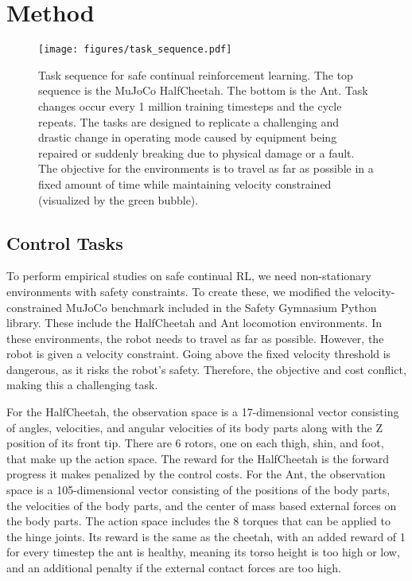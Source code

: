 \section{Method} \label{sec:method}

\begin{figure*}[t]
    \centering
    \texttt{[image: figures/task\_sequence.pdf]}
    \caption{Task sequence for safe continual reinforcement learning. The top sequence is the MuJoCo HalfCheetah. The bottom is the Ant. Task changes occur every 1 million training timesteps and the cycle repeats. The tasks are designed to replicate a challenging and drastic change in operating mode caused by equipment being repaired or suddenly breaking due to physical damage or a fault. The objective for the environments is to travel as far as possible in a fixed amount of time while maintaining velocity constrained (visualized by the green bubble).}
    \label{fig:task_sequence}
\end{figure*}

\subsection{Control Tasks}

To perform empirical studies on safe continual RL, we need non-stationary environments with safety constraints. To create these, we modified the velocity-constrained MuJoCo benchmark included in the Safety Gymnasium \cite{ji2023safety} Python library. These include the HalfCheetah and Ant locomotion environments. In these environments, the robot needs to travel as far as possible. However, the robot is given a velocity constraint. Going above the fixed velocity threshold is dangerous, as it risks the robot's safety. Therefore, the objective and cost conflict, making this a challenging task.

For the HalfCheetah, the observation space is a 17-dimensional vector consisting of angles, velocities, and angular velocities of its body parts along with the Z position of its front tip. There are 6 rotors, one on each thigh, shin, and foot, that make up the action space. The reward for the HalfCheetah is the forward progress it makes penalized by the control costs. For the Ant, the observation space is a 105-dimensional vector consisting of the positions of the body parts, the velocities of the body parts, and the center of mass based external forces on the body parts. The action space includes the 8 torques that can be applied to the hinge joints. Its reward is the same as the cheetah, with an added reward of 1 for every timestep the ant is healthy, meaning its torso height is too high or low, and an additional penalty if the external contact forces are too high.

